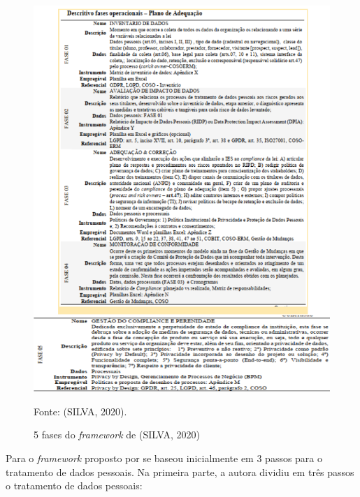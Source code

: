 \documentclass[
	12pt,				%
	openright,			%
	oneside,			%
	a4paper,			%
	english,			%
	french,				%
	spanish,			%
	brazil,				%
	]{abntex2}
\begin{document}
\begin{figure}[ht]
    \centering
    \caption{5 fases do \textit{framework} de (SILVA, 2020) }
    \includegraphics[width=5.6in]{Images/14Silva2020.png}
    \label{fig: silva3}
    
    \centering \small Fonte: (SILVA, 2020).
\end{figure}

\pagebreak


 Para o \textit{framework}  proposto por \cite{Zini2020} se baseou inicialmente em 3 passos para o tratamento de dados pessoais. Na primeira parte, a autora dividiu em três passos o tratamento de dados pessoais:
\end{document}
